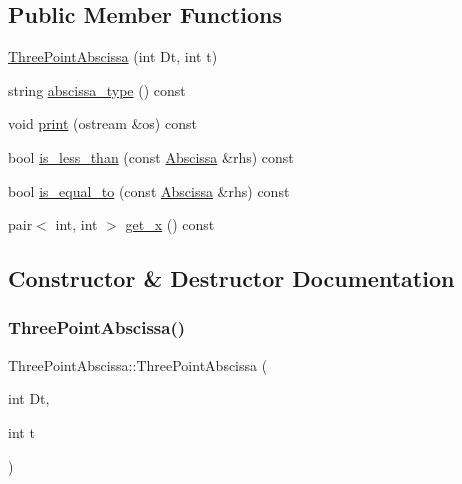 \subsection*{Public Member Functions}
\begin{DoxyCompactItemize}
\item 
\mbox{\hyperlink{classThreePointAbscissa_ad3c6670c74a71226a3da2d5232775abc}{Three\+Point\+Abscissa}} (int Dt, int t)
\item 
string \mbox{\hyperlink{classThreePointAbscissa_a44344558fa4ee658be3344dfc3e69b17}{abscissa\+\_\+type}} () const
\item 
void \mbox{\hyperlink{classThreePointAbscissa_aa312b658c93628deb092f769246707af}{print}} (ostream \&os) const
\item 
bool \mbox{\hyperlink{classThreePointAbscissa_a2e0b64a578a1dda361a4ef3dd61f75e8}{is\+\_\+less\+\_\+than}} (const \mbox{\hyperlink{classAbscissa}{Abscissa}} \&rhs) const
\item 
bool \mbox{\hyperlink{classThreePointAbscissa_a91dd5c897c1b2b1fe271597fdc0d5c3d}{is\+\_\+equal\+\_\+to}} (const \mbox{\hyperlink{classAbscissa}{Abscissa}} \&rhs) const
\item 
pair$<$ int, int $>$ \mbox{\hyperlink{classThreePointAbscissa_a5e20d950aaa2e9ccf7f4e33ebce296a2}{get\+\_\+x}} () const
\end{DoxyCompactItemize}


\subsection{Constructor \& Destructor Documentation}
\mbox{\label{classThreePointAbscissa_ad3c6670c74a71226a3da2d5232775abc}} 
\subsubsection{\texorpdfstring{ThreePointAbscissa()}{ThreePointAbscissa()}}
{\footnotesize\ttfamily Three\+Point\+Abscissa\+::\+Three\+Point\+Abscissa (\begin{DoxyParamCaption}\item[{int}]{Dt,  }\item[{int}]{t }\end{DoxyParamCaption})\hspace{0.3cm}{\ttfamily [inline]}}



